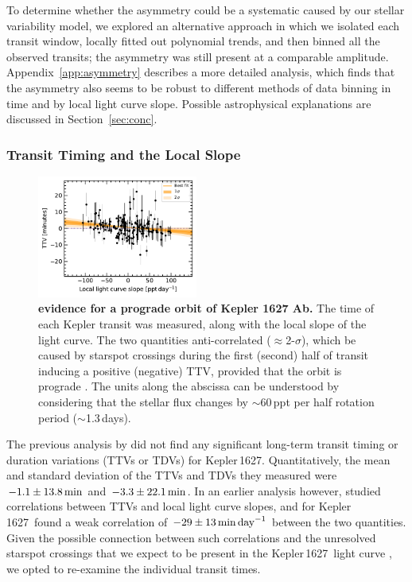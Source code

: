 \documentclass[12pt,modern,twocolumn,tighten,linenumbers]{aastex63}
\newcommand{\sn}{Kepler\,1627} %
\begin{document}
To determine whether the asymmetry could be a systematic caused by our
stellar variability model, we explored an alternative approach in
which we isolated each transit window, locally fitted out
polynomial trends, and then binned all the observed transits; the
asymmetry was still present at a comparable amplitude.
Appendix~\ref{app:asymmetry} describes a more detailed analysis, which finds
that the asymmetry also seems to be robust to different methods of
data binning in time and by local light curve slope.  Possible
astrophysical explanations are discussed in Section~\ref{sec:conc}.

\subsubsection{Transit Timing and the Local Slope}
\label{subsec:ttvslope}

\begin{figure}[tp]
	\begin{center}
		\leavevmode
		\includegraphics[width=0.47\textwidth]{f6.pdf}
	\end{center}
	\vspace{-0.6cm}
	\caption{
    {\bf {} evidence for a prograde orbit of Kepler 1627 Ab.} The time of
    each Kepler transit was measured, along with the local slope of
    the light curve.  The two quantities  anti-correlated
    ($\approx$2-$\sigma$), which
     be caused by starspot crossings during the first
    (second) half of transit inducing a positive (negative) TTV,
    provided that the orbit is prograde \citep{mazeh_time_2015}.  The
    units along the abscissa can be understood by considering that the
    stellar flux changes by $\sim$60\,ppt per half rotation period
    ($\sim$1.3\,days).
		\label{fig:corr}
	}
\end{figure}


The previous analysis by \citet{holczer_transit_2016} did not
find any significant long-term transit timing or duration variations
(TTVs or TDVs) for \sn.  Quantitatively, the mean and standard deviation of the
TTVs and TDVs they measured were $-1.1\pm13.8\,{\rm
min}$ and $-3.3\pm22.1\,{\rm min}$.  In an
earlier analysis however, \citet{holczer_time_2015} studied correlations
between TTVs and local light curve slopes, and for \sn\
found a weak correlation of $-29\pm13\,{\rm min}\,{\rm day}^{-1}$
between the two quantities.  Given the possible connection between such
correlations and the unresolved starspot crossings that we expect to
be present in the \sn\ light curve \citep{mazeh_time_2015}, we opted to re-examine the
individual transit times.
\end{document}
